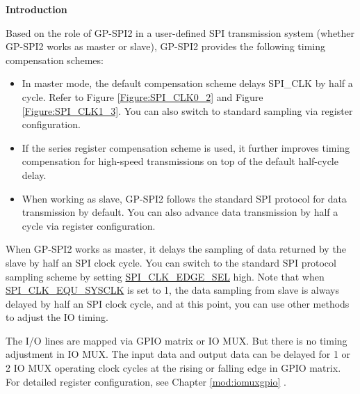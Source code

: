 \documentclass[main\_\_EN.tex]{subfiles}
\begin{document}
\textbf{Introduction}

Based on the role of GP-SPI2 in a user-defined SPI transmission system (whether GP-SPI2 works as master or slave), GP-SPI2 provides the following timing compensation schemes:
\begin{itemize}
    \item In master mode, the default compensation scheme delays SPI\_CLK by half a cycle. Refer to Figure \ref{Figure:SPI_CLK0_2} and Figure \ref{Figure:SPI_CLK1_3}. You can also switch to standard sampling via register configuration.
    \item If the series register compensation scheme is used, it further improves timing compensation for high-speed transmissions on top of the default half-cycle delay.
    \item When working as slave, GP-SPI2 follows the standard SPI protocol for data transmission by default. You can also advance data transmission by half a cycle via register configuration.
\end{itemize}

When GP-SPI2 works as master, it delays the sampling of data returned by the slave by half an SPI clock cycle. You can switch to the standard SPI protocol sampling scheme by setting \hyperref[fielddesc:SPICLKEDGESEL]{SPI\_CLK\_EDGE\_SEL} high. Note that when \hyperref[fielddesc:SPICLKEQUSYSCLK]{SPI\_CLK\_EQU\_SYSCLK} is set to 1, the data sampling from slave is always delayed by half an SPI clock cycle, and at this point, you can use other methods to adjust the IO timing.

The I/O lines are mapped via GPIO matrix or IO MUX. But there is no timing adjustment in IO MUX. The input data and output data can be delayed for 1 or 2 IO MUX operating clock cycles at the rising or falling edge in GPIO matrix. For detailed register configuration, see Chapter \ref{mod:iomuxgpio} \textit{}.
\end{document}
